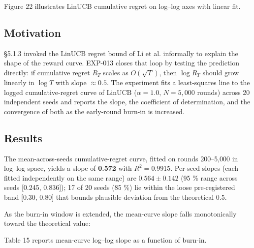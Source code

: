 Figure 22 illustrates LinUCB cumulative regret on log–log axes with linear fit.


\subsection{Motivation}\label{motivation}

§5.1.3 invoked the LinUCB regret bound of Li et al. \citeyearpar{Li2010} informally to explain the shape of the reward curve. EXP-013 closes that loop by testing the prediction directly: if cumulative regret \(R_T\) scales as \(O(\sqrt T)\), then \(\log R_T\) should grow linearly in \(\log T\) with slope \(\approx 0.5\). The experiment fits a least-squares line to the logged cumulative-regret curve of LinUCB (\(\alpha = 1.0\), \(N = 5{,}000\) rounds) across 20 independent seeds and reports the slope, the coefficient of determination, and the convergence of both as the early-round burn-in is increased.

\subsection{Results}\label{results-1}

The mean-across-seeds cumulative-regret curve, fitted on rounds 200--5,000 in log--log space, yields a slope of \textbf{0.572} with \(R^2 = 0.9915\). Per-seed slopes (each fitted independently on the same range) are \(0.564 \pm 0.142\) (95 \% range across seeds {[}0.245, 0.836{]}); 17 of 20 seeds (85 \%) lie within the loose pre-registered band {[}0.30, 0.80{]} that bounds plausible deviation from the theoretical 0.5.

As the burn-in window is extended, the mean-curve slope falls monotonically toward the theoretical value:

Table 15 reports mean-curve log--log slope as a function of burn-in.

\label{tab:5.6.1}

